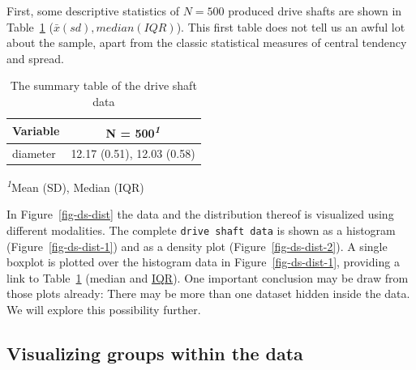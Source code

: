\documentclass[
  a4paper,
]{scrbook}
\begin{document}
First, some descriptive statistics of \(N=500\) produced drive shafts
are shown in Table~\ref{tbl-ds-sum} (\(\bar{x}(sd), median(IQR)\)). This
first table does not tell us an awful lot about the sample, apart from
the classic statistical measures of central tendency and spread.

\begingroup
\fontsize{12.0pt}{14.4pt}\selectfont
\setlength{\LTpost}{0mm}

\begin{longtable}{lc}

\caption{\label{tbl-ds-sum}The summary table of the drive shaft data}

\tabularnewline

\toprule
\textbf{Variable} & \textbf{N = 500}\textsuperscript{\textit{1}} \\ 
\midrule\addlinespace[2.5pt]
diameter & 12.17 (0.51), 12.03 (0.58) \\ 
\bottomrule

\end{longtable}

\begin{minipage}{\linewidth}
\textsuperscript{\textit{1}}Mean (SD), Median (IQR)\\
\end{minipage}
\endgroup

In Figure~\ref{fig-ds-dist} the data and the distribution thereof is
visualized using different modalities. The complete
\texttt{drive\ shaft\ data} is shown as a histogram
(Figure~\ref{fig-ds-dist-1}) and as a density plot
(Figure~\ref{fig-ds-dist-2}). A single boxplot is plotted over the
histogram data in Figure~\ref{fig-ds-dist-1}, providing a link to
Table~\ref{tbl-ds-sum} (median and \hyperref[acronyms_IQR]{IQR}). One
important conclusion may be draw from those plots already: There may be
more than one dataset hidden inside the data. We will explore this
possibility further.

\subsection{Visualizing groups within the
data}\label{visualizing-groups-within-the-data}
\end{document}
